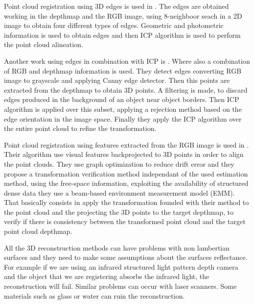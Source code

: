 Point cloud registration using 3D edges is used in \cite{choi13}. The edges are obtained working in the depthmap and the RGB image, 
using 8-neighboor seach in a 2D image to obtain four different types of edges. Geometric and photometric information is used to 
obtain edges and then ICP algorithm is used to perform the point cloud alineation.  


Another work using edges in combination with ICP is \cite{dryan2012}. Where also a combination of RGB and depthmap information is 
used. They detect edges converting RGB image to grayscale and applying Canny edge detector. Then this points are extracted from 
the depthmap to obtain 3D points. A filtering is made, to discard edges produced in the background of an object near object borders. 
Then ICP algorithm is applied over this subset, applying a rejection method based on the edge orientation in the image space. Finally 
they apply the ICP algorithm over the entire point cloud to refine the transformation.

Point cloud registration using features extracted from the RGB image is used in \cite{endres13}. Their algorithm use visual features 
backprojected to 3D points in order to align the point clouds. They use graph optimization to reduce drift error and they propose a 
transformation verification method independant of the used estimation method, using the free-space information,
exploiting the availability of structured dense data they use a beam-based environment measurement model (EMM). That basically consists 
in apply the transformation founded with their method to the point cloud and the projecting the 3D points to the target depthmap, 
to verify if there is consistency 
between the transformed point cloud and the target point cloud depthmap.


All the 3D reconstruction methods can have problems with non lambertian 
surfaces and they need to make some assumptions about the surfaces reflectance. For example if we are using 
an infrared structured light pattern depth camera and the object that we are registering absorbs the infrared light, 
the reconstruction will fail. Similar problems can occur with laser scanners. 
Some materials such as glass or water can ruin the reconstruction.










